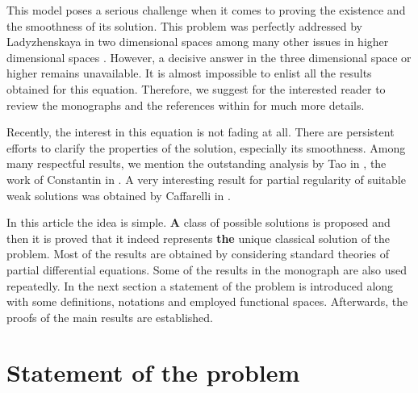 \documentclass[a4 paper, 11pt,twoside]{article}
\newcommand{\0}{\Bf{0}}
\theoremstyle{definition}
\begin{document}
This model poses a serious challenge when it comes to proving the existence and the smoothness of its solution. This problem was perfectly addressed by Ladyzhenskaya in two dimensional spaces among many other issues in higher dimensional spaces \cite{ladyF1}. However, a decisive answer in the three dimensional space or higher remains unavailable. It is almost impossible to enlist all the results obtained for this equation. Therefore, we suggest for the interested reader to review the monographs \cite{ladyF1,galdi,majda} and the references within for much more details.

Recently, the interest in this equation is not fading at all. There are persistent efforts to clarify the properties of the solution, especially its smoothness. Among many respectful results, we mention the outstanding analysis by Tao in \cite{tao}, the work of Constantin in \cite{consta1,consta2, consta3}. A very interesting result for partial regularity of suitable weak solutions was obtained by Caffarelli in \cite{caf}.

In this article the idea is simple. {\bf A} class of possible solutions is proposed and then it is proved that it indeed represents {\bf the} unique classical solution of the problem. Most of the results are obtained by considering standard theories of partial differential equations. Some of the results in the monograph \cite{majda} are also used repeatedly. In the next section a statement of the problem is introduced along with some definitions, notations and employed functional spaces. Afterwards, the proofs of the main results are established.
\section{Statement of the problem}
\end{document}
